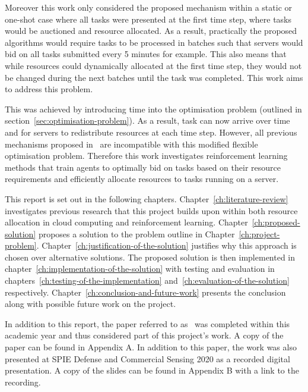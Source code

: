 Moreover this work only considered the proposed mechanism within a static or one-shot case where all tasks were presented
at the first time step, where tasks would be auctioned and resource allocated. As a result, practically the proposed
algorithms would require tasks to be processed in batches such that servers would bid on all tasks submitted every 5
minutes for example. This also means that while resources could dynamically allocated at the first time step, they
would not be changed during the next batches until the task was completed. This work aims to address this problem.

This was achieved by introducing time into the optimisation problem (outlined in section~\ref{sec:optimisation-problem}).
As a result, task can now arrive over time and for servers to redistribute resources at each time step. However, all
previous mechanisms proposed in~\cite{FlexibleResourceAllocation} are incompatible with this modified flexible
optimisation problem. Therefore this work investigates reinforcement learning methods that train agents to optimally
bid on tasks based on their resource requirements and efficiently allocate resources to tasks running on a server.

This report is set out in the following chapters. Chapter~\ref{ch:literature-review} investigates previous research
that this project builds upon within both resource allocation in cloud computing and reinforcement learning.
Chapter~\ref{ch:proposed-solution} proposes a solution to the problem outline in Chapter~\ref{ch:project-problem}.
Chapter~\ref{ch:justification-of-the-solution} justifies why this approach is chosen over alternative solutions.
The proposed solution is then implemented in chapter~\ref{ch:implementation-of-the-solution} with testing and
evaluation in chapters~\ref{ch:testing-of-the-implementation} and~\ref{ch:evaluation-of-the-solution} respectively.
Chapter~\ref{ch:conclusion-and-future-work} presents the conclusion along with possible future work on the project.

In addition to this report, the paper referred to as~\cite{FlexibleResourceAllocation} was completed within this
academic year and thus considered part of this project's work. A copy of the paper can be found in
Appendix A. In addition to this paper, the work was also presented at SPIE Defense and Commercial
Sensing 2020 as a recorded digital presentation. A copy of the slides can be found in
Appendix B with a link to the recording.

